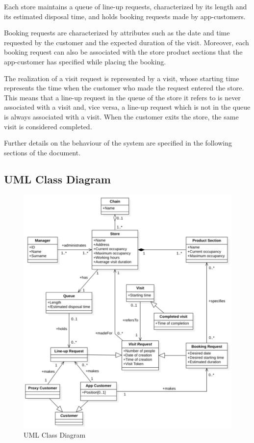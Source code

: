 \documentclass[a4paper,oneside,11pt]{book}   %
\begin{document}
    Each store maintains a queue of line-up requests, characterized by its length and its estimated disposal time, and holds booking requests made by app-customers. \par
    Booking requests are characterized by attributes such as the date and time requested by the customer and the expected duration of the visit. Moreover, each booking request can also be associated with the store product sections that the app-customer has specified while placing the booking. \par
    The realization of a visit request is represented by a visit, whose starting time represents the time when the customer who made the request entered the store. This means that a line-up request in the queue of the store it refers to is never associated with a visit and, vice versa, a line-up request which is not in the queue is always associated with a visit. When the customer exits the store, the same visit is considered completed. \par
    Further details on the behaviour of the system are specified in the following sections of the document.

    \subsection{UML Class Diagram} 
    \begin{figure}[H]
        \centering
        \includegraphics[width=\textwidth, height=\textheight, keepaspectratio]{pictures/uml_class_diagram}
        \caption{UML Class Diagram}
        \label{figure:uml}
    \end{figure}
    \newpage
\end{document}
